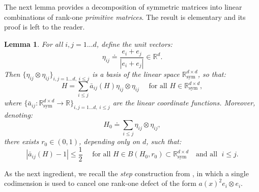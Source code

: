 \documentclass[reqno,twoside,11pt]{amsart}
\newcommand{\sym}{\mathrm{sym}}
\newcommand{\R}{\mathbb{R}}
\numberwithin{equation}{section}
\theoremstyle{plain}
\newtheorem{lemma}[theorem]{Lemma}
\theoremstyle{definition}
\begin{document}
\medskip

\noindent The next lemma provides a decomposition of symmetric
matrices into linear combinations of rank-one {\em primitive matrices}.
The result is elementary and its proof is left to the reader. 

\begin{lemma}\label{lem_dec_def}
For all $i,j=1\ldots d$, define the unit vectors:
$$\eta_{ij}\doteq\frac{e_i+e_j}{|e_i+e_j|} \in\R^d.$$
Then $\{\eta_{ij}\otimes \eta_{ij}\}_{i,j=1\ldots d,\;i\leq j}$ is a basis of the
linear space $\R^{d\times d}_\sym$, so that:
$$H=\sum_{i\leq j}\bar a_{ij}(H) \eta_{ij}\otimes \eta_{ij}
\quad\mbox{ for all } H\in \R^{d\times d}_\sym,$$
where $\big\{\bar a_{ij}:\R^{d\times d}_\sym\to \R\big\}_{i,j=1\ldots d,\;i\leq j}$
are the linear coordinate functions. Moreover, denoting:
\begin{equation}\label{H_0}
H_0 \doteq \sum_{i\leq j}\eta_{ij}\otimes \eta_{ij},
\end{equation}
there exists $r_0\in (0, 1)$, depending only on $d$, such that:
$$|\bar a_{ij} (H)-1|\leq\frac{1}{2} \quad \mbox{ for all } H\in
B(H_0,r_0)\subset \R^{d\times d}_{\sym} \quad \mbox{and all }\; i \leq j.$$
\end{lemma}

\medskip

\noindent As the next ingredient, we recall the {\em step} construction
from \cite[Lemma 2.1]{lew_conv}, in which a single codimension is used
to cancel one rank-one defect of the form $a(x)^2e_i\otimes e_i$.
\end{document}
